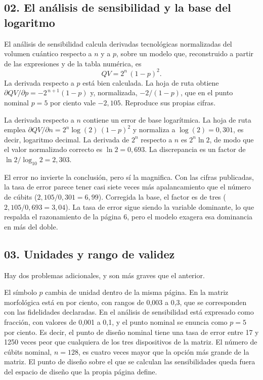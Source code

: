 \documentclass[11pt,letterpaper]{article}
\begin{document}
\subsection*{02. El análisis de sensibilidad y la base del logaritmo}

El análisis de sensibilidad calcula derivadas tecnológicas normalizadas del
volumen cuántico respecto a $n$ y a $p$, sobre un modelo que, reconstruido a
partir de las expresiones y de la tabla numérica, es
\[
  QV = 2^{n}\,(1-p)^{2}.
\]
La derivada respecto a $p$ está bien calculada. La hoja de ruta obtiene
$\partial QV/\partial p = -2^{\,n+1}(1-p)$ y, normalizada, $-2/(1-p)$, que en el
punto nominal $p = 5$ por ciento vale $-2{,}105$. Reproduce sus propias cifras.

La derivada respecto a $n$ contiene un error de base logarítmica. La hoja de
ruta emplea $\partial QV/\partial n = 2^{n}\log(2)\,(1-p)^{2}$ y normaliza a
$\log(2) = 0{,}301$, es decir, logaritmo decimal. La derivada de $2^{n}$
respecto a $n$ es $2^{n}\ln 2$, de modo que el valor normalizado correcto es
$\ln 2 = 0{,}693$. La discrepancia es un factor de $\ln 2 / \log_{10} 2 =
2{,}303$.

El error no invierte la conclusión, pero sí la magnifica. Con las cifras
publicadas, la tasa de error parece tener casi siete veces más apalancamiento
que el número de cúbits ($2{,}105 / 0{,}301 = 6{,}99$). Corregida la base, el
factor es de tres ($2{,}105 / 0{,}693 = 3{,}04$). La tasa de error sigue siendo
la variable dominante, lo que respalda el razonamiento de la página 6, pero el
modelo exagera esa dominancia en más del doble.

\subsection*{03. Unidades y rango de validez}

Hay dos problemas adicionales, y son más graves que el anterior.

El símbolo $p$ cambia de unidad dentro de la misma página. En la matriz
morfológica está en por ciento, con rangos de 0,003 a 0,3, que se corresponden
con las fidelidades declaradas. En el análisis de sensibilidad está expresado
como fracción, con valores de 0,001 a 0,1, y el punto nominal se enuncia como
$p = 5$ por ciento. Es decir, el punto de diseño nominal tiene una tasa de
error entre 17 y 1250 veces peor que cualquiera de los tres dispositivos de la
matriz. El número de cúbits nominal, $n = 128$, es cuatro veces mayor que la
opción más grande de la matriz. El punto de diseño sobre el que se calculan
las sensibilidades queda fuera del espacio de diseño que la propia página
define.
\end{document}
